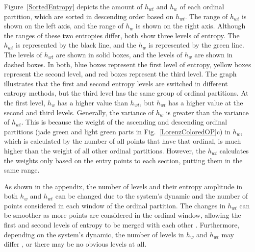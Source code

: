 \documentclass[%
 aip,
 amsmath,amssymb,
 reprint,%
]{revtex4-1}
\newcommand{\ignore}[2]{\hspace{0in}#2}
\begin{document}
Figure~\ref{SortedEntropy} depicts the amount of $h_{wt}$ and $h_w$ of each ordinal partition, which are sorted in descending order based on $h_{wt}$. The range of $h_{wt}$ is shown on the left axis, and the range of $h_w$ is shown on the right axis. Although the ranges of these two entropies differ, both show three levels of entropy. The $h_{wt}$ is represented by the black line, and the $h_w$ is represented by the green line. The levels of $h_{wt}$ are shown in solid boxes, and the levels of $h_w$ are shown in dashed boxes. In both, blue boxes represent the first level of entropy, yellow boxes represent the second level, and red boxes represent the third level. The graph illustrates that the first and second entropy levels are switched in different entropy methods, but the third level has the same group of ordinal partitions. At the first level, $h_w$ has a higher value than $h_{wt}$, but $h_{wt}$ has a higher value at the second and third levels. Generally, the variance of $h_w$ is greater than the variance of $h_{wt}$. This is because the weight of the ascending and descending ordinal partitions (jade green and light green parts in Fig.~\ref{LorenzColoredOP}c) in $h_w$, which is calculated by the number of all points that have that ordinal, is much higher than the weight of all other ordinal partitions. However, the $h_{wt}$ calculates the weights only based on the entry points to each section, putting them in the same range.

As shown in the appendix, the number of levels and their entropy amplitude in both $h_w$ and $h_{wt}$ can be changed due to the system's dynamic and the number of points considered in each window of the ordinal partition. The changes in $h_{wt}$ can be smoother as more points are considered in the ordinal window, allowing the first and second levels of entropy to be merged with each other \ignore{(Fig.~\ref{LorenzColoredOP_m10:a})}. Furthermore, depending on the system's dynamic, the number of levels in $h_w$ and $h_{wt}$ may differ \ignore{(Fig.~\ref{RosslerColoredOP:a} and Fig.~\ref{RosslerColoredOP:b})}, or there may be no obvious levels at all\ignore{(Fig.~\ref{MackeyGlassColoredOP:a} and Fig.~\ref{MackeyGlassColoredOP:b})}.
\end{document}
